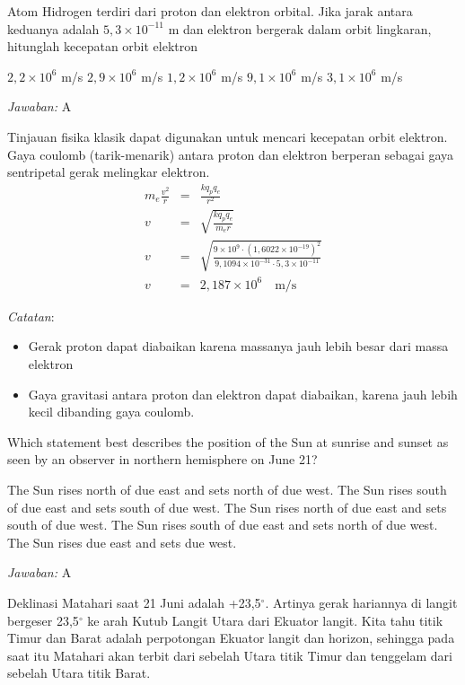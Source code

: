 \documentclass[11pt,fleqn]{exam}
\begin{document}
\begin{questions}
\question Atom Hidrogen terdiri dari proton dan elektron orbital. Jika jarak antara keduanya adalah $5,3 \times 10^{-11}$ m dan elektron bergerak dalam orbit lingkaran, hitunglah kecepatan orbit elektron
\begin{choices}
\choice $2,2 \times 10^{6}$ m/s
\choice $2,9 \times 10^{6}$ m/s
\choice $1,2 \times 10^{6}$ m/s
\choice $9,1 \times 10^{6}$ m/s
\choice $3,1 \times 10^{6}$ m/s
\end{choices}

\textit{Jawaban: } A

Tinjauan fisika klasik dapat digunakan untuk mencari kecepatan orbit elektron. Gaya coulomb (tarik-menarik) antara proton dan elektron berperan sebagai gaya sentripetal gerak melingkar elektron. 
\begin{eqnarray*}
m_{e} \frac{v^2}{r} &=& \frac{k q_p q_e}{r^2}\\
v &=& \sqrt{\frac{k q_p q_e}{m_e r}}\\
v &=& \sqrt{\frac{9 \times 10^9 \cdot (1,6022 \times 10^{-19})^2}{9,1094 \times 10^{-31} \cdot 5,3 \times 10^{-11}}}\\
v &=& 2,187 \times 10^{6} \quad \text{m/s}
\end{eqnarray*}

\textit{Catatan}:
\begin{itemize}
\item Gerak proton dapat diabaikan karena massanya jauh lebih besar dari massa elektron
\item Gaya gravitasi antara proton dan elektron dapat diabaikan, karena jauh lebih kecil dibanding gaya coulomb.
\end{itemize}



\question Which statement best describes the position of the Sun at sunrise and sunset as seen by an observer in northern hemisphere on June 21?
\begin{choices}
\choice The Sun rises north of due east and sets north of due west.
\choice The Sun rises south of due east and sets south of due west.
\choice The Sun rises north of due east and sets south of due west.
\choice The Sun rises south of due east and sets north of due west.
\choice The Sun rises due east and sets due west.
\end{choices}

\textit{Jawaban: } A

Deklinasi Matahari saat 21 Juni adalah +23,5$^{\circ}$. Artinya gerak hariannya di langit bergeser 23,5$^{\circ}$ ke arah Kutub Langit Utara dari Ekuator langit. Kita tahu titik Timur dan Barat adalah perpotongan Ekuator langit dan horizon, sehingga pada saat itu Matahari akan terbit dari sebelah Utara titik Timur dan tenggelam dari sebelah Utara titik Barat.


\end{questions}
\end{document}
